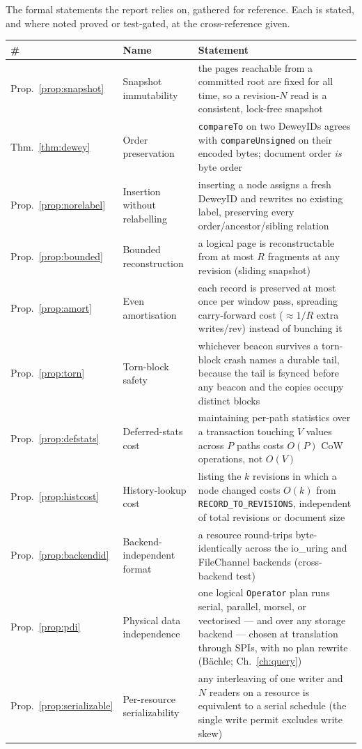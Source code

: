 \documentclass[11pt,a4paper,oneside]{report}
\theoremstyle{sirixthm}
\newcommand{\code}[1]{\texttt{#1}}
\begin{document}
The formal statements the report relies on, gathered for reference. Each is stated, and where noted
proved or test-gated, at the cross-reference given.

{\small
\begin{xltabular}{\linewidth}{@{}l >{\RaggedRight\arraybackslash}p{0.26\textwidth} >{\RaggedRight\arraybackslash}X@{}}
\toprule
\textbf{\#} & \textbf{Name} & \textbf{Statement}\\
\midrule
\endhead
Prop.~\ref{prop:snapshot} & Snapshot immutability & the pages reachable from a committed root are fixed for all time, so a revision-$N$ read is a consistent, lock-free snapshot\\
Thm.~\ref{thm:dewey} & Order preservation & \code{compareTo} on two DeweyIDs agrees with \code{compareUnsigned} on their encoded bytes; document order \emph{is} byte order\\
Prop.~\ref{prop:norelabel} & Insertion without relabelling & inserting a node assigns a fresh DeweyID and rewrites no existing label, preserving every order/ancestor/sibling relation\\
Prop.~\ref{prop:bounded} & Bounded reconstruction & a logical page is reconstructable from at most $R$ fragments at any revision (sliding snapshot)\\
Prop.~\ref{prop:amort} & Even amortisation & each record is preserved at most once per window pass, spreading carry-forward cost ($\approx 1/R$ extra writes/rev) instead of bunching it\\
Prop.~\ref{prop:torn} & Torn-block safety & whichever beacon survives a torn-block crash names a durable tail, because the tail is fsynced before any beacon and the copies occupy distinct blocks\\
Prop.~\ref{prop:defstats} & Deferred-stats cost & maintaining per-path statistics over a transaction touching $V$ values across $P$ paths costs $O(P)$ CoW operations, not $O(V)$\\
Prop.~\ref{prop:histcost} & History-lookup cost & listing the $k$ revisions in which a node changed costs $O(k)$ from \code{RECORD\_TO\_REVISIONS}, independent of total revisions or document size\\
Prop.~\ref{prop:backendid} & Backend-independent format & a resource round-trips byte-identically across the io\_uring and FileChannel backends (cross-backend test)\\
Prop.~\ref{prop:pdi} & Physical data independence & one logical \code{Operator} plan runs serial, parallel, morsel, or vectorised --- and over any storage backend --- chosen at translation through SPIs, with no plan rewrite (B\"achle; Ch.~\ref{ch:query})\\
Prop.~\ref{prop:serializable} & Per-resource serializability & any interleaving of one writer and $N$ readers on a resource is equivalent to a serial schedule (the single write permit excludes write skew)\\
\bottomrule
\end{xltabular}}
\end{document}
